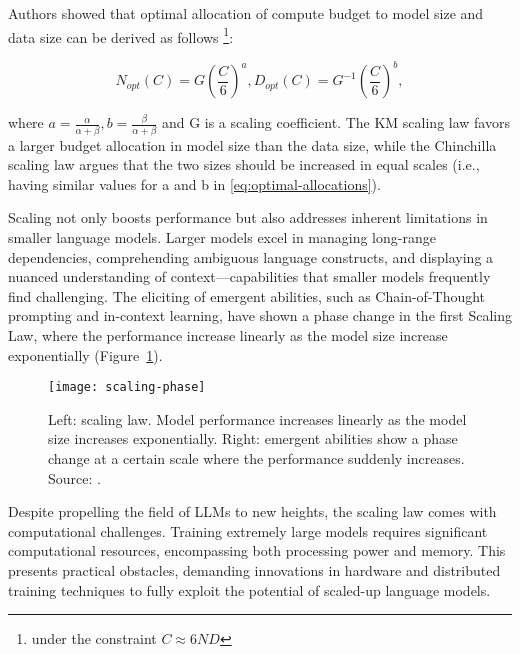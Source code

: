 \begin{enumerate}
{		      Authors showed that optimal allocation of compute budget to model size and data size can be derived as follows \footnote{under the constraint \(C \approx 6ND\)}:

		      \begin{center}
			      \begin{equation}
				      N_{opt}(C) = G(\frac{C}{6})^a, D_{opt}(C) = G^{-1}(\frac{C}{6})^b, \label{eq:optimal-allocations}
			      \end{equation}
		      \end{center}

		      \noindent where $a=\frac{\alpha}{\alpha+\beta}, b=\frac{\beta}{\alpha+\beta}$ and G is a scaling coefficient.
		      The KM scaling law favors a larger budget allocation in model size than the data size, while the Chinchilla scaling law argues that the two sizes should be increased in equal scales \cite{hoffmann2022training} (i.e., having similar values for a and b in \eqref{eq:optimal-allocations}).
	      }
\end{enumerate}

Scaling not only boosts performance but also addresses inherent limitations in smaller language models.
Larger models excel in managing long-range dependencies, comprehending ambiguous language constructs, and displaying a nuanced understanding of context---capabilities that smaller models frequently find challenging.
The eliciting of emergent abilities, such as Chain-of-Thought prompting and in-context learning, have shown a phase change in the first Scaling Law, where the performance increase linearly as the model size increase exponentially (Figure~\ref{fig:scaling-phase}).

\begin{figure}[h!]
	\centering
	\texttt{[image: scaling-phase]}
	\caption{Left: scaling law. Model performance increases linearly as the model size increases exponentially. Right: emergent abilities show a phase change at a certain scale where the performance suddenly increases. Source: \protect\textcite{yaofu2023emergent}.}
	\label{fig:scaling-phase}
\end{figure}

Despite propelling the field of LLMs to new heights, the scaling law comes with computational challenges.
Training extremely large models requires significant computational resources, encompassing both processing power and memory.
This presents practical obstacles, demanding innovations in hardware and distributed training techniques to fully exploit the potential of scaled-up language models.


